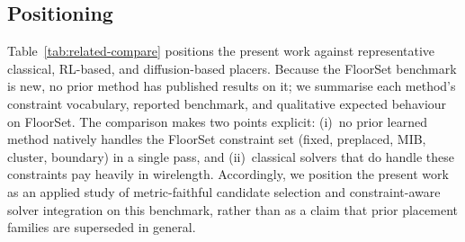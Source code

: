 \documentclass[nolineno]{ieeeaccess}
\begin{document}
\subsection{Positioning}
Table~\ref{tab:related-compare} positions the present work against
representative classical, RL-based, and diffusion-based placers.
Because the FloorSet benchmark is new, no prior method has
published results on it; we summarise each method's constraint
vocabulary, reported benchmark, and qualitative expected behaviour on
FloorSet. The comparison makes two points explicit: (i)~no prior
learned method natively handles the FloorSet constraint set (fixed,
preplaced, MIB, cluster, boundary) in a single pass, and (ii)~classical
solvers that do handle these constraints pay heavily in wirelength.
Accordingly, we position the present work as an applied study of
metric-faithful candidate selection and constraint-aware solver
integration on this benchmark, rather than as a claim that prior
placement families are superseded in general.
\end{document}
